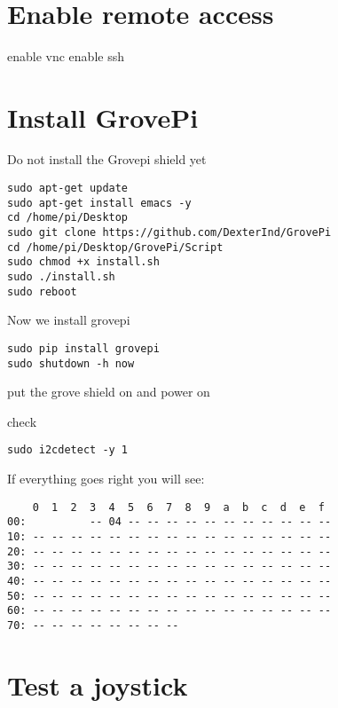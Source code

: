 \MDNAME\

\section{Enable remote access}

enable vnc enable ssh

\section{Install GrovePi}

Do not install the Grovepi shield yet

\begin{lstlisting}
sudo apt-get update
sudo apt-get install emacs -y
cd /home/pi/Desktop
sudo git clone https://github.com/DexterInd/GrovePi
cd /home/pi/Desktop/GrovePi/Script
sudo chmod +x install.sh
sudo ./install.sh
sudo reboot
\end{lstlisting}

Now we install grovepi

\begin{lstlisting}
sudo pip install grovepi
sudo shutdown -h now
\end{lstlisting}

put the grove shield on and power on

check

\begin{lstlisting}
sudo i2cdetect -y 1
\end{lstlisting}

If everything goes right you will see:

\begin{lstlisting}
    0  1  2  3  4  5  6  7  8  9  a  b  c  d  e  f
00:          -- 04 -- -- -- -- -- -- -- -- -- -- -- 
10: -- -- -- -- -- -- -- -- -- -- -- -- -- -- -- -- 
20: -- -- -- -- -- -- -- -- -- -- -- -- -- -- -- -- 
30: -- -- -- -- -- -- -- -- -- -- -- -- -- -- -- -- 
40: -- -- -- -- -- -- -- -- -- -- -- -- -- -- -- -- 
50: -- -- -- -- -- -- -- -- -- -- -- -- -- -- -- -- 
60: -- -- -- -- -- -- -- -- -- -- -- -- -- -- -- --
70: -- -- -- -- -- -- -- --        
\end{lstlisting}

\section{Test a joystick}

